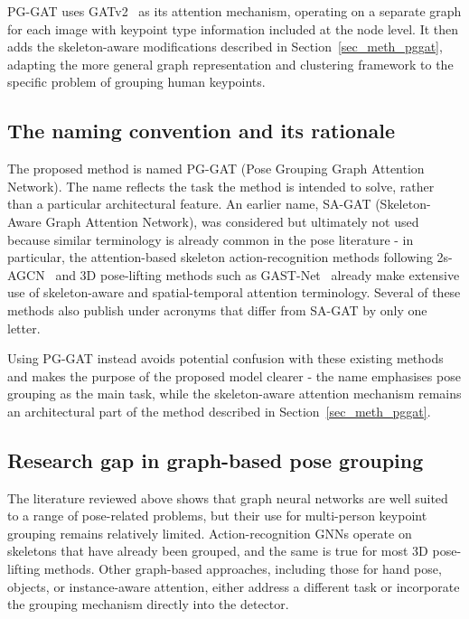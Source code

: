 PG-GAT uses GATv2~\cite{brody2022gatv2} as its attention mechanism,
operating on a separate graph for each image with keypoint type information included at the node level.
It then adds the skeleton-aware modifications described in Section~\ref{sec_meth_pggat},
adapting the more general graph representation and clustering framework
to the specific problem of grouping human keypoints.

\subsection{The naming convention and its rationale}
\label{sec_lit_gnn_pose_naming}

The proposed method is named PG-GAT (Pose Grouping Graph Attention Network).
The name reflects the task the method is intended to solve, rather than a particular architectural feature.
An earlier name, SA-GAT (Skeleton-Aware Graph Attention Network),
was considered but ultimately not used
because similar terminology is already common in the pose literature -
in particular,
the attention-based skeleton action-recognition methods following 2s-AGCN~\cite{shi2019twostreamadaptive}
and 3D pose-lifting methods such as GAST-Net~\cite{liu2020gastnet}
already make extensive use of skeleton-aware and spatial-temporal attention terminology.
Several of these methods also publish under acronyms that differ from SA-GAT by only one letter.

Using PG-GAT instead avoids potential confusion with these existing methods
and makes the purpose of the proposed model clearer -
the name emphasises pose grouping as the main task,
while the skeleton-aware attention mechanism remains an architectural part of the method
described in Section~\ref{sec_meth_pggat}.

\subsection{Research gap in graph-based pose grouping}
\label{sec_lit_gnn_pose_niche}

The literature reviewed above shows that graph neural networks are well suited to a range of pose-related problems,
but their use for multi-person keypoint grouping remains relatively limited.
Action-recognition GNNs operate on skeletons that have already been grouped,
and the same is true for most 3D pose-lifting methods.
Other graph-based approaches,
including those for hand pose, objects, or instance-aware attention,
either address a different task or incorporate the grouping mechanism directly into the detector.

